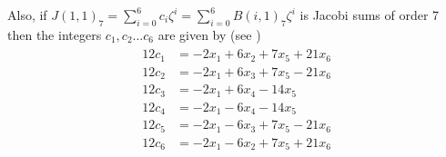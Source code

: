\documentclass[a4paper,12pt]{article}
\begin{document}
Also, if $J(1,1)_{7}=\displaystyle{\sum_{i =0}^{6}c_{i}\zeta^i}=\displaystyle{\sum_{i =0}^{6}B(i,1)_{7}{\zeta}^{i}}$ is Jacobi sums of order 7 then the integers $c_{1},c_{2}\dots c_{6}$ are given by (see \cite{11})
\begin{eqnarray}\label{eq:9}
\begin{aligned}
12c_{1}&=-2x_{1}+6x_{2}+7x_{5}+21x_{6}\\
12c_{2}&=-2x_{1}+6x_{3}+7x_{5}-21x_{6}\\
12c_{3}&=-2x_{1}+6x_{4}-14x_{5}\\
12c_{4}&=-2x_{1}-6x_{4}-14x_{5}\\
12c_{5}&=-2x_{1}-6x_{3}+7x_{5}-21x_{6}\\
12c_{6}&=-2x_{1}-6x_{2}+7x_{5}+21x_{6}
\end{aligned}
\end{eqnarray}
\end{document}
